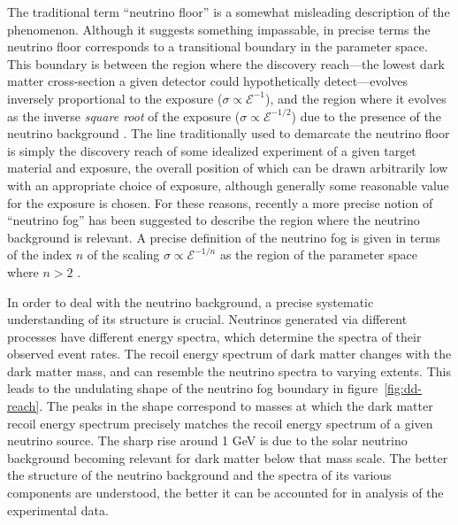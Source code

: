 \documentclass[b5paper, 10pt, twoside]{book}
\begin{document}
The traditional term ``neutrino floor'' is a somewhat misleading description of the phenomenon. Although it suggests something impassable, in precise terms the neutrino floor corresponds to a transitional boundary in the parameter space. This boundary is between the region where the discovery reach---the lowest dark matter cross-section a given detector could hypothetically detect---evolves inversely proportional to the exposure ($\sigma\propto \mathcal{E}^{-1}$), and the region where it evolves as the inverse \emph{square root} of the exposure ($\sigma\propto \mathcal{E}^{-1/2}$) due to the presence of the neutrino background \parencite{BillardFigueroaFelicianoStrigari2014}. The line traditionally used to demarcate the neutrino floor is simply the discovery reach of some idealized experiment of a given target material and exposure, the overall position of which can be drawn arbitrarily low with an appropriate choice of exposure, although generally some reasonable value for the exposure is chosen. For these reasons, recently a more precise notion of ``neutrino fog'' has been suggested to describe the region where the neutrino background is relevant. A precise definition of the neutrino fog is given in terms of the index $n$ of the scaling $\sigma\propto \mathcal{E}^{-1/n}$ as the region of the parameter space where $n>2$ \parencites{OHare2021, CarewEtAl2024}.

In order to deal with the neutrino background, a precise systematic understanding of its structure is crucial. Neutrinos generated via different processes have different energy spectra, which determine the spectra of their observed event rates. The recoil energy spectrum of dark matter changes with the dark matter mass, and can resemble the neutrino spectra to varying extents. This leads to the undulating shape of the neutrino fog boundary in figure~\ref{fig:dd-reach}. The peaks in the shape correspond to masses at which the dark matter recoil energy spectrum precisely matches the recoil energy spectrum of a given neutrino source. The sharp rise around 1 GeV is due to the solar neutrino background becoming relevant for dark matter below that mass scale. The better the structure of the neutrino background and the spectra of its various components are understood, the better it can be accounted for in analysis of the experimental data.
\end{document}
